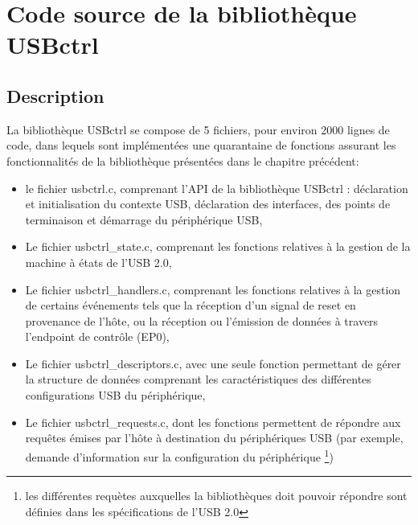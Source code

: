 \section{Code source de la bibliothèque USBctrl}

\subsection{Description}

La bibliothèque USBctrl se compose de 5 fichiers, pour environ 2000 lignes de code, dans lequels sont implémentées une quarantaine de fonctions assurant les fonctionnalités de la bibliothèque présentées dans le chapitre précédent:
\begin{itemize}
	\item le fichier usbctrl.c, comprenant l'API de la bibliothèque USBctrl : déclaration et initialisation du contexte USB, déclaration des interfaces, des points de terminaison et démarrage du périphérique USB,
	\item Le fichier usbctrl\_state.c, comprenant les fonctions relatives à la gestion de la machine à états de l'USB 2.0,
	\item Le fichier usbctrl\_handlers.c, comprenant les fonctions relatives à la gestion de certains événements tels que la réception d'un signal de reset en provenance de l'hôte, ou la réception ou l'émission de données à travers l'endpoint de contrôle (EP0),
	\item Le fichier usbctrl\_descriptors.c, avec une seule fonction permettant de gérer la structure de données comprenant les caractéristiques des différentes configurations USB du périphérique,
	\item Le fichier usbctrl\_requests.c, dont les fonctions permettent de répondre aux requêtes émises par l'hôte à destination du périphériques USB (par exemple, demande d'information sur la configuration du périphérique \footnote{les différentes requètes auxquelles la bibliothèques doit pouvoir répondre sont définies dans les spécifications de l'USB 2.0})
\end{itemize}


